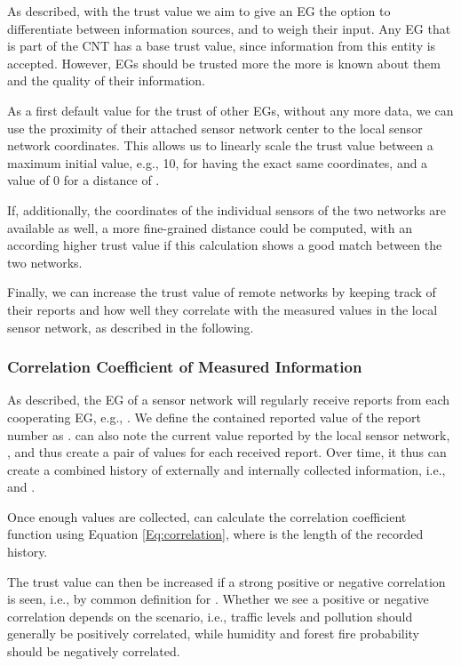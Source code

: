 \documentclass[onecolumn]{jaise2e}
\begin{document}
As described, with the trust value we aim to give an EG the option to differentiate between information sources, and to weigh their input. Any EG that is part of the CNT has a base trust value, since information from this entity is accepted. However, EGs should be trusted more the more is known about them and the quality of their information.

As a first default value for the trust of other EGs, without any more data, we can use the proximity of their attached sensor network center to the local sensor network coordinates. This allows us to linearly scale the trust value between a maximum initial value, e.g., 10, for having the exact same coordinates, and a value of 0 for a distance of .

If, additionally, the coordinates of the individual sensors of the two networks are available as well, a more fine-grained distance could be computed, with an according higher trust value if this calculation shows a good match between the two networks.

Finally, we can increase the trust value of remote networks by keeping track of their reports and how well they correlate with the measured values in the local sensor network, as described in the following.

\subsubsection{Correlation Coefficient of Measured Information}\label{subsubsec:coeff}

\begin{figure*}

\end{figure*}


As described, the EG of a sensor network  will regularly receive reports from each cooperating EG, e.g., . We define the contained reported value of the report number  as .  can also note the current value reported by the local sensor network, , and thus create a pair of values for each received report. Over time, it thus can create a combined history of externally and internally collected information, i.e.,  and .

Once enough values are collected,  can calculate the correlation coefficient function  using Equation \ref{Eq:correlation}, where  is the length of the recorded history.


The trust value can then be increased if a strong positive or negative correlation is seen, i.e., by common definition for . Whether we see a positive or negative correlation depends on the scenario, i.e., traffic levels and pollution should generally be positively correlated, while humidity and forest fire probability should be negatively correlated.
\end{document}
